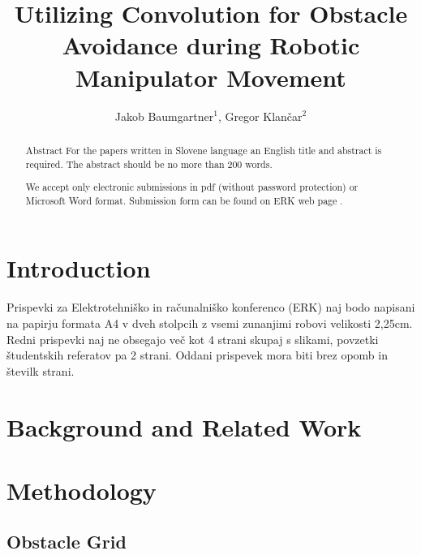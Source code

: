 \documentclass[a4paper]{article}
\begin{document}
\title{Utilizing Convolution for Obstacle Avoidance during Robotic Manipulator Movement}

\author{Jakob Baumgartner$^{1}$, Gregor Klančar$^{2}$} %



\maketitle


\begin{abstract}{Abstract}
For the papers written in Slovene language an English title and abstract is required. The abstract should be no more than 200 words. 

We accept only electronic submissions in pdf (without password protection) or Microsoft Word format. Submission form can be found on ERK web page \cite{ERK}.
\end{abstract}



\section{Introduction }

Prispevki za Elektrotehniško in računalniško konferenco (ERK) naj bodo napisani na papirju formata A4 v dveh stolpcih z vsemi zunanjimi robovi velikosti 2,25cm. Redni prispevki naj ne obsegajo več kot 4 strani skupaj s slikami, povzetki študentskih referatov pa 2 strani. Oddani prispevek mora biti brez opomb in številk strani.

\section{Background and Related Work}

\section{Methodology }

\subsection{Obstacle Grid}
\end{document}
